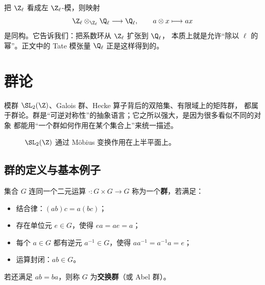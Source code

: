 \begin{example}
把 $\Z_\ell$ 看成左 $\Z_\ell$-模，则映射
\[
  \Z_\ell\otimes_{\Z_\ell}\Q_\ell \longrightarrow \Q_\ell,
  \qquad a\otimes x\longmapsto ax
\]
是同构。它告诉我们：把系数环从 $\Z_\ell$ 扩张到 $\Q_\ell$，
本质上就是允许“除以 $\ell$ 的幂”。正文中的 Tate 模张量 $\Q_\ell$ 正是这样得到的。
\end{example}

\section{群论}
\label{sec:app-group-theory}

模群 $\SL_2(\Z)$、Galois 群、Hecke 算子背后的双陪集、有限域上的矩阵群，
都属于群论。群是“可逆对称性”的抽象语言；它之所以强大，是因为很多看似不同的对象
都能用“一个群如何作用在某个集合上”来统一描述。

\begin{figure}[H]
\centering
{}
\caption{$\SL_2(\Z)$ 通过 Möbius 变换作用在上半平面上。}
\end{figure}

\subsection{群的定义与基本例子}

\begin{definition}[群]
集合 $G$ 连同一个二元运算 $\cdot\colon G\times G\to G$ 称为一个\textbf{群}，若满足：
\begin{itemize}
  \item[(1)] 结合律：$(ab)c=a(bc)$；
  \item[(2)] 存在单位元 $e\in G$，使得 $ea=ae=a$；
  \item[(3)] 每个 $a\in G$ 都有逆元 $a^{-1}\in G$，使得 $aa^{-1}=a^{-1}a=e$；
  \item[(4)] 运算封闭：$ab\in G$。
\end{itemize}
若还满足 $ab=ba$，则称 $G$ 为\textbf{交换群}（或 Abel 群）。
\end{definition}


